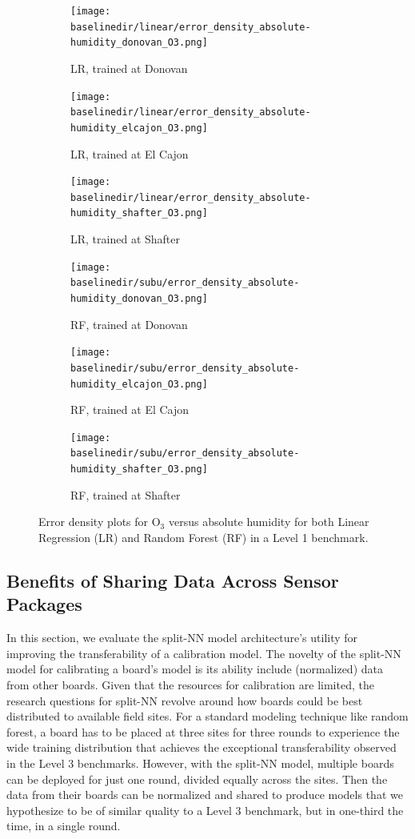 \documentclass[journal abbreviation, manuscript]{copernicus}
\newcommand{\textus}[1]{$_{\text{#1}}$}
\begin{document}
\begin{figure}[t]
\centering
\begin{subfigure}{0.33\textwidth}
\texttt{[image: \\baselinedir/linear/error\_density\_absolute-humidity\_donovan\_O3.png]}
\caption{LR, trained at Donovan}
\end{subfigure}
\begin{subfigure}{0.33\textwidth}
\texttt{[image: \\baselinedir/linear/error\_density\_absolute-humidity\_elcajon\_O3.png]}
\caption{LR, trained at El Cajon}
\end{subfigure}
\begin{subfigure}{0.33\textwidth}
\texttt{[image: \\baselinedir/linear/error\_density\_absolute-humidity\_shafter\_O3.png]}
\caption{LR, trained at Shafter}
\end{subfigure}
\begin{subfigure}{0.33\textwidth}
\texttt{[image: \\baselinedir/subu/error\_density\_absolute-humidity\_donovan\_O3.png]}
\caption{RF, trained at Donovan}
\end{subfigure}
\begin{subfigure}{0.33\textwidth}
\texttt{[image: \\baselinedir/subu/error\_density\_absolute-humidity\_elcajon\_O3.png]}
\caption{RF, trained at El Cajon}
\end{subfigure}
\begin{subfigure}{0.33\textwidth}
\texttt{[image: \\baselinedir/subu/error\_density\_absolute-humidity\_shafter\_O3.png]}
\caption{RF, trained at Shafter}
\end{subfigure}
\caption{Error density plots for O\textus{3} versus absolute humidity for both Linear Regression (LR) and Random Forest (RF) in a Level 1 benchmark.}
\label{fig:error-density}
\end{figure}


\subsection{Benefits of Sharing Data Across Sensor Packages}
In this section, we evaluate the split-NN model architecture's utility for improving the transferability of a calibration model.  The novelty of the split-NN model for calibrating a board's model is its ability include (normalized) data from other boards.  Given that the resources for calibration are limited, the research questions for split-NN revolve around how boards could be best distributed to available field sites.  For a standard modeling technique like random forest, a board has to be placed at three sites for three rounds to experience the wide training distribution that achieves the exceptional transferability observed in the Level 3 benchmarks.  However, with the split-NN model, multiple boards can be deployed for just one round, divided equally across the sites.  Then the data from their boards can be normalized and shared to produce models that we hypothesize to be of similar quality to a Level 3 benchmark, but in one-third the time, in a single round.
\end{document}
